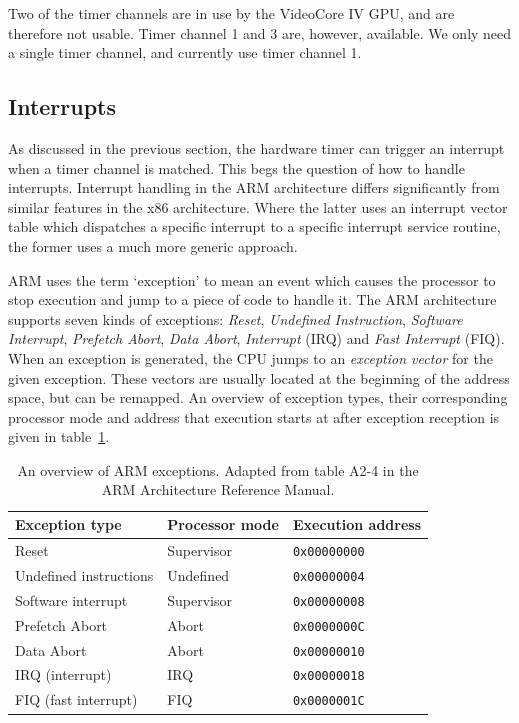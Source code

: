 Two of the timer channels are in use by the VideoCore IV GPU, and are therefore not usable. Timer channel 1 and 3 are, however, available. We only need a single timer channel, and currently use timer channel 1.

\subsection{Interrupts}
As discussed in the previous section, the hardware timer can trigger an interrupt when a timer channel is matched. This begs the question of how to handle interrupts. Interrupt handling in the ARM architecture differs significantly from similar features in the x86 architecture. Where the latter uses an interrupt vector table which dispatches a specific interrupt to a specific interrupt service routine, the former uses a much more generic approach.

ARM uses the term `exception' to mean an event which causes the processor to stop execution and jump to a piece of code to handle it. The ARM architecture supports seven kinds of exceptions: \textit{Reset}, \textit{Undefined Instruction}, \textit{Software Interrupt}, \textit{Prefetch Abort}, \textit{Data Abort}, \textit{Interrupt} (IRQ) and \textit{Fast Interrupt} (FIQ). When an exception is generated, the CPU jumps to an \textit{exception vector} for the given exception. These vectors are usually located at the beginning of the address space, but can be remapped. An overview of exception types, their corresponding processor mode and address that execution starts at after exception reception is given in table~\ref{tbl:exceptions}.

\begin{table}[h]
    \centering
    \begin{tabular}{lll}
        \toprule
        \textbf{Exception type} & \textbf{Processor mode} & \textbf{Execution address} \\
        \midrule
        Reset & Supervisor & \texttt{0x00000000} \\
        Undefined instructions & Undefined & \texttt{0x00000004} \\
        Software interrupt & Supervisor & \texttt{0x00000008} \\
        Prefetch Abort & Abort & \texttt{0x0000000C} \\
        Data Abort & Abort & \texttt{0x00000010} \\
        IRQ (interrupt) & IRQ & \texttt{0x00000018} \\
        FIQ (fast interrupt) & FIQ & \texttt{0x0000001C} \\
        \bottomrule
    \end{tabular}
    \caption{An overview of ARM exceptions. Adapted from table A2-4 in the ARM Architecture Reference Manual\cite{arm:arm}.}
    \label{tbl:exceptions}
\end{table}

